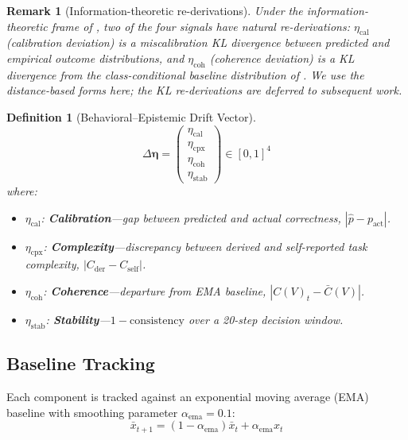 \documentclass[11pt,twocolumn]{article}
\newtheorem{definition}[theorem]{Definition}
\newtheorem{remark}[theorem]{Remark}
\newcommand{\deta}{\ensuremath{\Delta\bm{\eta}}}
\begin{document}
\begin{remark}[Information-theoretic re-derivations]
Under the information-theoretic frame of ,
two of the four signals have natural re-derivations:
$\eta_{\text{cal}}$ (calibration deviation) is a miscalibration
KL divergence between predicted and empirical outcome
distributions, and $\eta_{\text{coh}}$ (coherence deviation) is a
KL divergence from the class-conditional baseline distribution of
. We use the distance-based forms here;
the KL re-derivations are deferred to subsequent work.
\end{remark}

\begin{definition}[Behavioral--Epistemic Drift Vector]
\label{def:drift}
\begin{equation}
  \deta = \begin{pmatrix}
    \eta_{\text{cal}} \\
    \eta_{\text{cpx}} \\
    \eta_{\text{coh}} \\
    \eta_{\text{stab}}
  \end{pmatrix} \in [0,1]^4
  \label{eq:drift-vector}
\end{equation}
where:
\begin{itemize}
\item $\eta_{\text{cal}}$: \textbf{Calibration}---gap
  between predicted and actual correctness,
  $|\hat{p} - p_{\text{act}}|$.
\item $\eta_{\text{cpx}}$: \textbf{Complexity}---discrepancy
  between derived and self-reported task complexity,
  $|C_{\text{der}} - C_{\text{self}}|$.
\item $\eta_{\text{coh}}$: \textbf{Coherence}---departure
  from EMA baseline, $|C(V)_t - \bar{C}(V)|$.
\item $\eta_{\text{stab}}$: \textbf{Stability}---$1 -
  \text{consistency}$ over a 20-step decision window.
\end{itemize}
\end{definition}

\subsection{Baseline Tracking}

Each component is tracked against an exponential moving average (EMA)
baseline with smoothing parameter $\alpha_{\text{ema}} = 0.1$:
\begin{equation}
  \bar{x}_{t+1} = (1 - \alpha_{\text{ema}})\bar{x}_t
  + \alpha_{\text{ema}} x_t
  \label{eq:ema}
\end{equation}
\end{document}
